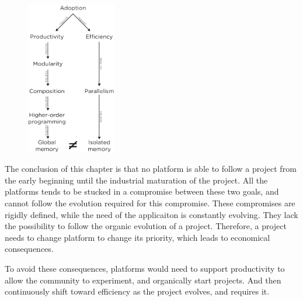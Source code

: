 \begin{figure}
  \vspace{-27pt}
  \begin{center}
    \includegraphics[width=0.35\textwidth]{../resources/insights.pdf}
  \end{center}
  \vspace{-20pt}
\end{figure}

The conclusion of this chapter is that no platform is able to follow a project from the early beginning until the industrial maturation of the project.
All the platforms tends to be stucked in a compromise between these two goals, and cannot follow the evolution required for this compromise.
These compromises are rigidly defined, while the need of the applicaiton is constantly evolving.
They lack the possibility to follow the organic evolution of a project.
Therefore, a project needs to change platform to change its priority, which leads to economical consequences.

To avoid these consequences, platforms would need to support productivity to allow the community to experiment, and organically start projects.
And then continuously shift toward efficiency as the project evolves, and requires it.

                                    \endinput


Some links I NEED to put :
--------------------------

https://glyph.twistedmatrix.com/2014/02/unyielding.html
http://calculist.org/blog/2011/12/14/why-coroutines-wont-work-on-the-web/

